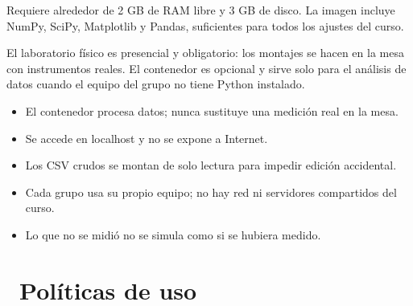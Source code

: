 \documentclass[11pt,a4paper]{article}
\newcommand{\iconotexto}[2]{\textcolor{cyanNeon}{\faIcon{#1}}~#2}
\begin{document}
Requiere alrededor de 2 GB de RAM libre y 3 GB de disco. La imagen incluye NumPy, SciPy, Matplotlib y Pandas, suficientes para todos los ajustes del curso.

El laboratorio físico es presencial y obligatorio: los montajes se hacen en la mesa con instrumentos reales. El contenedor es opcional y sirve solo para el análisis de datos cuando el equipo del grupo no tiene Python instalado.

\begin{itemize}[leftmargin=1.4em,itemsep=2pt,topsep=3pt]
  \item El contenedor procesa datos; nunca sustituye una medición real en la mesa.
  \item Se accede en localhost y no se expone a Internet.
  \item Los CSV crudos se montan de solo lectura para impedir edición accidental.
  \item Cada grupo usa su propio equipo; no hay red ni servidores compartidos del curso.
  \item Lo que no se midió no se simula como si se hubiera medido.
\end{itemize}

\section{\iconotexto{balance-scale}{Políticas de uso}}
\end{document}
